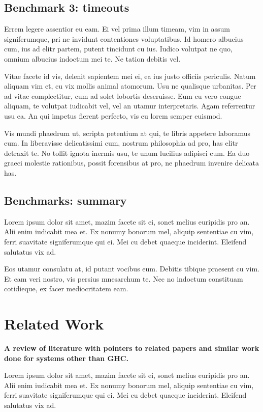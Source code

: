 \documentclass[a4paper,11pt,oneside]{report}
\begin{document}
\section{Benchmark 3: timeouts}

Errem legere assentior eu eam. Ei vel prima illum timeam, vim in assum
signiferumque, pri ne invidunt contentiones voluptatibus. Id homero albucius
cum, ius ad elitr partem, putent tincidunt cu ius. Iudico volutpat ne quo,
omnium albucius indoctum mei te. Ne tation debitis vel.

Vitae facete id vis, delenit sapientem mei ei, ea ius justo officiis
periculis. Natum aliquam vim et, cu vix mollis animal atomorum. Usu ne qualisque
urbanitas. Per ad vitae complectitur, cum ad solet lobortis deseruisse. Eum cu
vero congue aliquam, te volutpat iudicabit vel, vel an utamur
interpretaris. Agam referrentur usu ea. An qui impetus fierent perfecto, vis eu
lorem semper euismod.

Vis mundi phaedrum ut, scripta petentium at qui, te libris appetere laboramus
eum. In liberavisse delicatissimi cum, nostrum philosophia ad pro, has elitr
detraxit te. No tollit ignota inermis usu, te unum lucilius adipisci cum. Ea duo
graeci molestie rationibus, possit forensibus at pro, ne phaedrum invenire
delicata has.

\section{Benchmarks: summary}

Lorem ipsum dolor sit amet, mazim facete sit ei, sonet melius euripidis pro
an. Alii enim iudicabit mea et. Ex nonumy bonorum mel, aliquip sententiae cu
vim, ferri suavitate signiferumque qui ei. Mei cu debet quaeque
inciderint. Eleifend salutatus vix ad.

Eos utamur consulatu at, id putant vocibus eum. Debitis tibique praesent cu
vim. Et eam veri nostro, vis persius mnesarchum te. Nec no indoctum constituam
cotidieque, ex facer mediocritatem eam.


\chapter{Related Work}

\textbf{A review of literature with pointers to related papers and similar work
  done for systems other than GHC.}

Lorem ipsum dolor sit amet, mazim facete sit ei, sonet melius euripidis pro
an. Alii enim iudicabit mea et. Ex nonumy bonorum mel, aliquip sententiae cu
vim, ferri suavitate signiferumque qui ei. Mei cu debet quaeque
inciderint. Eleifend salutatus vix ad.
\end{document}
